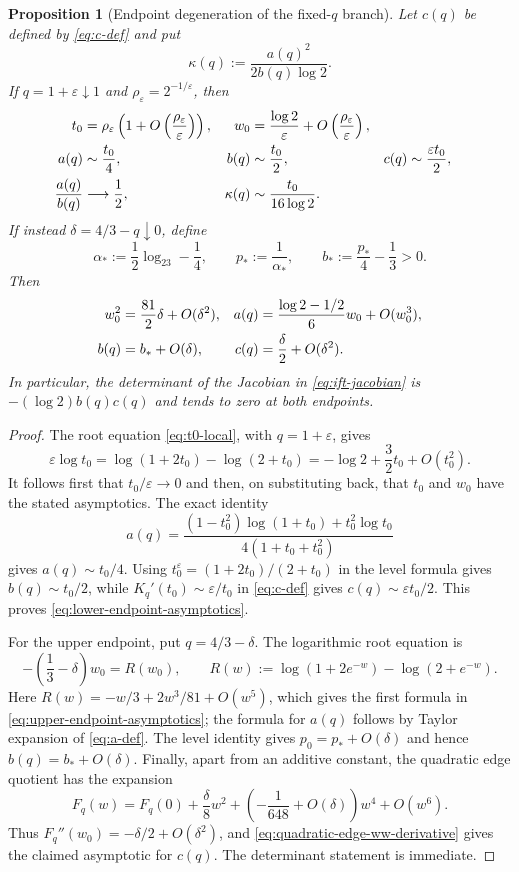 \documentclass[11pt,reqno]{amsart}
\numberwithin{equation}{section}
\newtheorem{proposition}[proposition]{Proposition}
\theoremstyle{definition}
\theoremstyle{remark}
\newcommand{\logtwo}{\log_2}
\begin{document}
\begin{proposition}[Endpoint degeneration of the fixed-$q$ branch]
\label{prop:endpoint-degeneration}
Let $c(q)$ be defined by \eqref{eq:c-def} and put
\[
  \kappa(q):=\frac{a(q)^2}{2b(q)\log2}.
\]
If $q=1+\varepsilon\downarrow1$ and
$\rho_\varepsilon=2^{-1/\varepsilon}$, then
\begin{align}\label{eq:lower-endpoint-asymptotics}
  t_0&=\rho_\varepsilon
       \left(1+O\left(\frac{\rho_\varepsilon}{\varepsilon}\right)\right),&
  w_0&=\frac{\log2}{\varepsilon}
       +O\left(\frac{\rho_\varepsilon}{\varepsilon}\right),\notag\\
  a(q)&\sim\frac{t_0}{4},&
  b(q)&\sim\frac{t_0}{2},&
  c(q)&\sim\frac{\varepsilon t_0}{2},\notag\\
  \frac{a(q)}{b(q)}&\longrightarrow\frac12,&
  \kappa(q)&\sim\frac{t_0}{16\log2}.
\end{align}
If instead $\delta=4/3-q\downarrow0$, define
\[
  \alpha_*:=\frac12\logtwo3-\frac14,
  \qquad p_*:=\frac1{\alpha_*},
  \qquad b_*:=\frac{p_*}{4}-\frac13>0.
\]
Then
\begin{align}\label{eq:upper-endpoint-asymptotics}
  w_0^2&=\frac{81}{2}\delta+O(\delta^2),&
  a(q)&=\frac{\log2-1/2}{6}w_0+O(w_0^3),\notag\\
  b(q)&=b_*+O(\delta),&
  c(q)&=\frac\delta2+O(\delta^2).
\end{align}
In particular, the determinant of the Jacobian in
\eqref{eq:ift-jacobian} is $-(\log2)b(q)c(q)$ and tends to zero at both
endpoints.
\end{proposition}

\begin{proof}
The root equation \eqref{eq:t0-local}, with $q=1+\varepsilon$, gives
\[
  \varepsilon\log t_0
  =\log(1+2t_0)-\log(2+t_0)
  =-\log2+\frac32t_0+O(t_0^2).
\]
It follows first that $t_0/\varepsilon\to0$ and then, on substituting back,
that $t_0$ and $w_0$ have the stated asymptotics.  The exact identity
\[
  a(q)=
  \frac{(1-t_0^2)\log(1+t_0)+t_0^2\log t_0}
  {4(1+t_0+t_0^2)}
\]
gives $a(q)\sim t_0/4$.  Using
$t_0^\varepsilon=(1+2t_0)/(2+t_0)$ in the level formula gives
$b(q)\sim t_0/2$, while
$K_q'(t_0)\sim\varepsilon/t_0$ in \eqref{eq:c-def} gives
$c(q)\sim\varepsilon t_0/2$.  This proves
\eqref{eq:lower-endpoint-asymptotics}.

For the upper endpoint, put $q=4/3-\delta$.  The logarithmic root equation is
\[
  -\left(\frac13-\delta\right)w_0
  =R(w_0),\qquad
  R(w):=\log(1+2e^{-w})-\log(2+e^{-w}).
\]
Here $R(w)=-w/3+2w^3/81+O(w^5)$, which gives the first formula in
\eqref{eq:upper-endpoint-asymptotics}; the formula for $a(q)$ follows by
Taylor expansion of \eqref{eq:a-def}.  The level identity gives
$p_0=p_*+O(\delta)$ and hence $b(q)=b_*+O(\delta)$.  Finally, apart from an
additive constant, the quadratic edge quotient has the expansion
\[
  F_q(w)=F_q(0)+\frac\delta8w^2
  +\left(-\frac1{648}+O(\delta)\right)w^4+O(w^6).
\]
Thus $F_q''(w_0)=-\delta/2+O(\delta^2)$, and
\eqref{eq:quadratic-edge-ww-derivative} gives the claimed asymptotic for
$c(q)$.  The determinant statement is immediate.
\end{proof}
\end{document}
